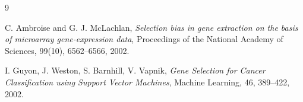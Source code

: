 \documentclass[11pt,a4paper]{article}
\begin{document}
\begin{thebibliography}{9}

C. Ambroise and G. J. McLachlan,
\emph{Selection bias in gene extraction on the basis of microarray gene-expression data},
Proceedings of the National Academy of Sciences, 99(10), 6562--6566, 2002.

I. Guyon, J. Weston, S. Barnhill, V. Vapnik,
\emph{Gene Selection for Cancer Classification using Support Vector Machines},
Machine Learning, 46, 389--422, 2002.

\end{thebibliography}
\end{document}
